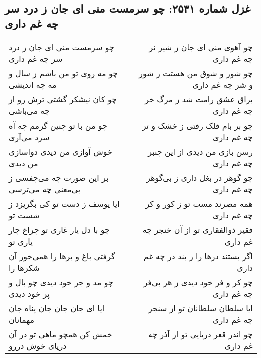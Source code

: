 \begin{center}
\section*{غزل شماره ۲۵۳۱: چو سرمست منی ای جان ز درد سر چه غم داری}
\label{sec:2531}
\begin{longtable}{l p{0.5cm} r}
چو سرمست منی ای جان ز درد سر چه غم داری
&&
چو آهوی منی ای جان ز شیر نر چه غم داری
\\
چو مه روی تو من باشم ز سال و مه چه اندیشی
&&
چو شور و شوق من هستت ز شور و شر چه غم داری
\\
چو کان نیشکر گشتی ترش رو از چه می‌باشی
&&
براق عشق رامت شد ز مرگ خر چه غم داری
\\
چو من با تو چنین گرمم چه آه سرد می‌آری
&&
چو بر بام فلک رفتی ز خشک و تر چه غم داری
\\
خوش آوازی من دیدی دواسازی من دیدی
&&
رسن بازی من دیدی از این چنبر چه غم داری
\\
بر این صورت چه می‌چفسی ز بی‌معنی چه می‌ترسی
&&
چو گوهر در بغل داری ز بی‌گوهر چه غم داری
\\
ایا یوسف ز دست تو کی بگریزد ز شست تو
&&
همه مصرند مست تو ز کور و کر چه غم داری
\\
چو با دل یار غاری تو چراغ چار یاری تو
&&
فقیر ذوالفقاری تو از آن خنجر چه غم داری
\\
گرفتی باغ و برها را همی‌خور آن شکرها را
&&
اگر بستند درها را ز بند در چه غم داری
\\
چو مد و جر خود دیدی چو بال و پر خود دیدی
&&
چو کر و فر خود دیدی ز هر بی‌فر چه غم داری
\\
ایا ای جان جان جان پناه جان مهمانان
&&
ایا سلطان سلطانان تو از سنجر چه غم داری
\\
خمش کن همچو ماهی تو در آن دریای خوش دررو
&&
چو اندر قعر دریایی تو از آذر چه غم داری
\\
\end{longtable}
\end{center}
